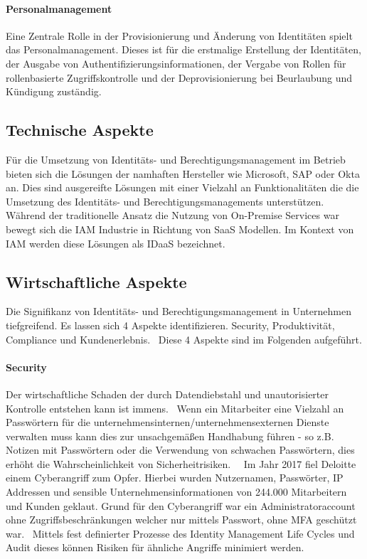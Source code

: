 \documentclass[12pt]{article}
\begin{document}
\paragraph{Personalmanagement}
Eine Zentrale Rolle in der Provisionierung und Änderung von Identitäten spielt das Personalmanagement. Dieses ist für die erstmalige Erstellung der Identitäten, der Ausgabe von Authentifizierungsinformationen, der Vergabe von Rollen für rollenbasierte Zugriffskontrolle und der Deprovisionierung bei Beurlaubung und Kündigung zuständig.~\cite{YOUNG20045}\cite{mohammed2017systematic}
\subsection{Technische Aspekte}
Für die Umsetzung von Identitäts- und Berechtigungsmanagement im Betrieb bieten sich die Lösungen der namhaften Hersteller wie Microsoft, SAP oder Okta an. Dies sind ausgereifte Lösungen mit einer Vielzahl an Funktionalitäten die die Umsetzung des Identitäts- und Berechtigungsmanagements unterstützen. Während der traditionelle Ansatz die Nutzung von On-Premise Services war bewegt sich die IAM Industrie in Richtung von SaaS Modellen. Im Kontext von IAM werden diese Lösungen als IDaaS bezeichnet.~\cite{kunz2014analyzing}
\subsection{Wirtschaftliche Aspekte}
Die Signifikanz von Identitäts- und Berechtigungsmanagement in Unternehmen tiefgreifend. Es lassen sich 4 Aspekte identifizieren. Security, Produktivität, Compliance und Kundenerlebnis.~\cite{mont2010economics}\cite{azhar2014economics} Diese 4 Aspekte sind im Folgenden aufgeführt.
\paragraph{Security}
Der wirtschaftliche Schaden der durch Datendiebstahl und unautorisierter Kontrolle entstehen kann ist immens.~\cite{azhar2014economics} Wenn ein Mitarbeiter eine Vielzahl an Passwörtern für die unternehmensinternen/unternehmensexternen Dienste verwalten muss kann dies zur unsachgemäßen Handhabung führen - so z.B. Notizen mit Passwörtern oder die Verwendung von schwachen Passwörtern, dies erhöht die Wahrscheinlichkeit von Sicherheitrisiken.~\cite{haag2012selecting}~\cite{azhar2014economics} Im Jahr 2017 fiel Deloitte einem Cyberangriff zum Opfer. Hierbei wurden Nutzernamen, Passwörter, IP Addressen und sensible Unternehmensinformationen von 244.000 Mitarbeitern und Kunden geklaut. Grund für den Cyberangriff war ein Administratoraccount ohne Zugriffsbeschränkungen welcher nur mittels Passwort, ohne MFA geschützt war.~\cite{deloitte2017} Mittels fest definierter Prozesse des Identity Management Life Cycles und Audit dieses können Risiken für ähnliche Angriffe minimiert werden.
\end{document}
